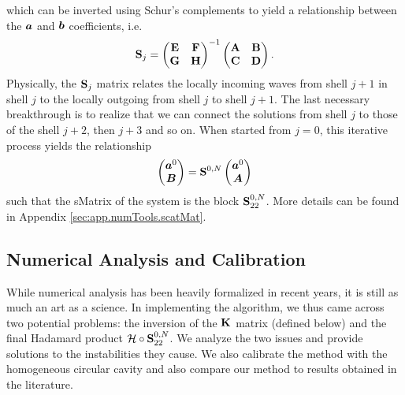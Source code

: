 which can be inverted using Schur's complements \cite[p.~123]{MEY2001} to yield a relationship between the 
$\boldsymbol{a}$ and $\boldsymbol{b}$ coefficients, i.e.
  \begin{equation}
   \mathbf{S}_j = \begin{pmatrix}\mathbf{E} & \mathbf{F} \\ \mathbf{G} & \mathbf{H} \end{pmatrix}^{-1}\begin{pmatrix}\mathbf{A} & \mathbf{B} \\ \mathbf{C} & \mathbf{D} \end{pmatrix}.
  \end{equation}
Physically, the $\mathbf{S}_j$ matrix relates the locally 
incoming waves from shell $j+1$ in shell $j$ to the locally 
outgoing from shell $j$ to shell $j+1$. The last necessary
breakthrough is to realize that we can connect the solutions
from shell $j$ to those of the shell $j+2$, then $j+3$ and 
so on. When started from $j=0$, this iterative process yields
the relationship
  \begin{equation}
   \begin{pmatrix}\boldsymbol{a}^0\\\boldsymbol{B}\end{pmatrix} = \mathbf{S}^{0,N}\begin{pmatrix}\boldsymbol{a}^0\\\boldsymbol{A}\end{pmatrix}
  \end{equation}
such that the \gls{sMatrix} of the system is
the block $\mathbf{S}_{22}^{0,N}$. More details can be found
in Appendix \ref{sec:app.numTools.scatMat}. 
  
\subsection{Numerical Analysis and Calibration}
While numerical analysis has been heavily formalized in recent years, 
it is still as much an art as a science. In implementing the algorithm, 
we thus came across two potential problems: the inversion of the 
$\mathbf{K}$ matrix (defined below) and the final Hadamard product
$\mathcal{H}\circ\mathbf{S}^{0,N}_{22}$. We analyze the two issues
and provide solutions to the instabilities they cause. We also 
calibrate the method with the homogeneous circular cavity and 
also compare our method to results obtained in the literature. 

